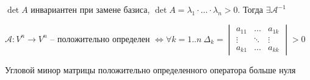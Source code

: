 \documentclass[12pt]{article}
\begin{document}
    \Notas $\det A$ инвариантен при замене базиса, $\det A = \lambda_1 \cdot \dots \cdot \lambda_n > 0$. Тогда $\exists \mathcal{A}^{-1}$

    \hypertarget{criterionSilvester}{}

    \begin{MyTheorem}

    $\mathcal{A}: V^n \to V^n$ -- положительно определен $\Longleftrightarrow \forall k = 1..n \ \Delta_k =
    \begin{vmatrix}a_{11} & \dots & a_{1k} \\ \vdots & \ddots & \vdots \\ a_{k1} & \dots & a_{kk}\end{vmatrix} > 0$ 

    Угловой минор матрицы положительно определенного оператора больше нуля

    \end{MyTheorem}
\end{document}
